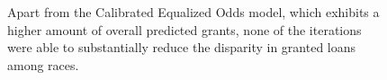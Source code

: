 \begin{figure}[h]
    \label{fig:Racial_Disparities}
    \caption*{Apart from the Calibrated Equalized Odds model, which exhibits a higher amount of overall predicted grants, none of the iterations were able to substantially reduce the disparity in granted loans among races.}
\end{figure}


